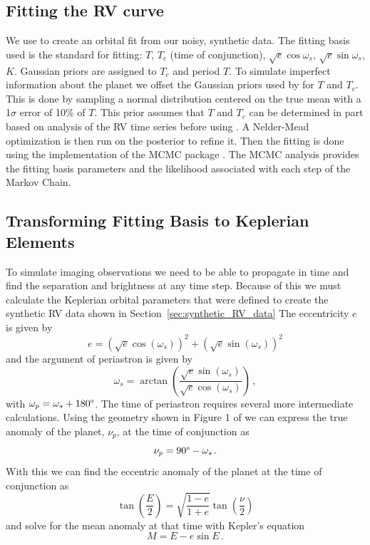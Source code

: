 \subsection{Fitting the RV curve}%
\label{sec:rvfit}
We use  \citep{fultonRadvelRadialVelocity2018} to create an
orbital fit from our noisy, synthetic data. The fitting basis used is the
 standard for fitting: $T$, $T_c$ (time of conjunction),
$\sqrt{e}\cos{\omega_s}$, $\sqrt{e}\sin{\omega_s}$, $K$.  Gaussian priors are
assigned to $T_c$ and period $T$. To simulate imperfect information about the
planet we offset the Gaussian priors used by  for $T$ and $T_c$.
This is done by sampling a normal distribution centered on the true mean with a
1$\sigma$ error of 10\% of $T$. This prior assumes that $T$ and $T_c$ can be
determined in part based on analysis of the RV time series before using
. A Nelder-Mead \citep{Nelder1965,Gao2010a} optimization is then
run on the posterior to refine it. Then the fitting is done using the
 implementation of the MCMC package  \citep{emcee}.
The MCMC analysis provides the fitting basis parameters and the likelihood
associated with each step of the Markov Chain.

\subsection{Transforming Fitting Basis to Keplerian Elements}
To simulate imaging observations we need to be able to propagate in time and find the separation and
brightness at any time step. Because of this we must calculate the Keplerian orbital parameters
that were defined to create the synthetic RV data shown in Section~\ref{sec:synthetic_RV_data} 
The eccentricity $e$ is given by 
\begin{equation}
     e = \left( \sqrt{e} \cos(\omega_s) \right)^2 + \left( \sqrt{e} \sin(\omega_s) \right)^2
\end{equation}
and the argument of periastron is given by
\begin{equation}
    \omega_s = \arctan\left(\frac{\sqrt{e} \sin(\omega_s)}{\sqrt{e} \cos(\omega_s)}\right) \,,
\end{equation}
with $\omega_p = \omega _s + 180\degree$. The time of periastron requires
several more intermediate calculations.  Using the geometry shown in Figure 1
of \citet{fultonRadvelRadialVelocity2018} we can express the true anomaly of
the planet, $\nu_p$, at the time of conjunction as
\begin{equation}
    \nu_p = 90\degree - \omega_s \,.
\end{equation}
With this we can find the eccentric anomaly of the planet at the time of conjunction as
\begin{equation}%
    \label{eq:ecc_anom}
    \tan \left( \frac{E}{2}\right) = \sqrt{\frac{1-e}{1+e}} \tan \left(\frac{\nu}{2}\right)
\end{equation}
and solve for the mean anomaly at that time with Kepler's equation
\begin{equation}%
    \label{eq:mean_anom}
    M = E - e \sin{E} \,.
\end{equation}

